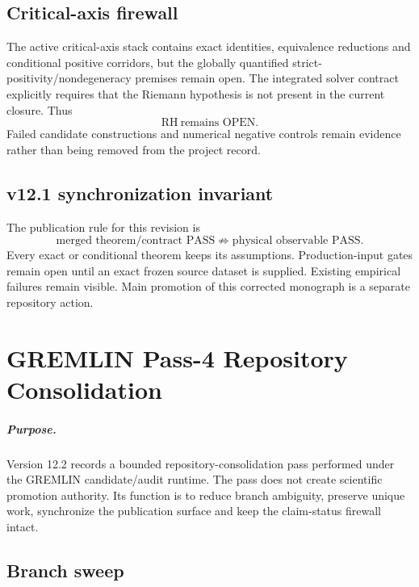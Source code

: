 \section{Critical-axis firewall}

The active critical-axis stack contains exact identities, equivalence
reductions and conditional positive corridors, but the globally quantified
strict-positivity/nondegeneracy premises remain open.  The integrated solver
contract explicitly requires that the Riemann hypothesis is not present in the
current closure.  Thus
\[
\boxed{\mathrm{RH}\ \text{remains OPEN}.}
\]
Failed candidate constructions and numerical negative controls remain evidence
rather than being removed from the project record.

\section{v12.1 synchronization invariant}

The publication rule for this revision is
\[
\boxed{
\text{merged theorem/contract PASS}
\not\Rightarrow
\text{physical observable PASS}.
}
\]
Every exact or conditional theorem keeps its assumptions.  Production-input
gates remain open until an exact frozen source dataset is supplied.  Existing
empirical failures remain visible.  Main promotion of this corrected monograph
is a separate repository action.

\clearpage

\chapter{GREMLIN Pass-4 Repository Consolidation}
\label{app:v12_gremlin_pass4}

\paragraph{Purpose.}
Version 12.2 records a bounded repository-consolidation pass performed under the
GREMLIN candidate/audit runtime.  The pass does not create scientific promotion
authority.  Its function is to reduce branch ambiguity, preserve unique work,
synchronize the publication surface and keep the claim-status firewall intact.

\section{Branch sweep}


